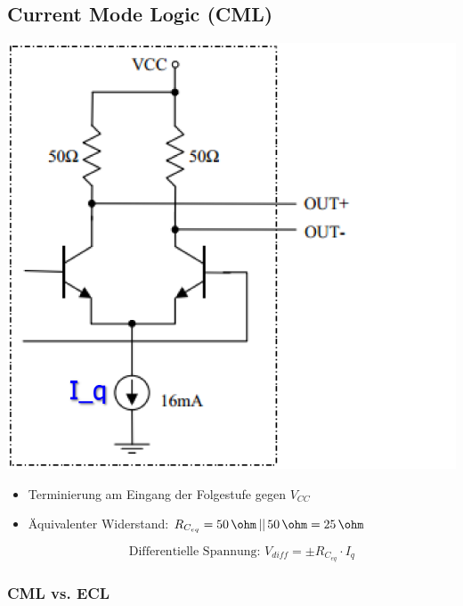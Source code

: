 \subsection{Current Mode Logic (CML)}

\begin{minipage}[c]{0.25\columnwidth}
    \includegraphics[width=\columnwidth]{images/CML.png}
\end{minipage}
\hfill
\begin{minipage}[c]{0.72\columnwidth}
   \begin{itemize}
    \item Terminierung am Eingang der Folgestufe gegen $V_{CC}$
    \item Äquivalenter Widerstand: $R_{C_{eq}} = 50 \, \ohm \, || \, 50 \, \ohm = 25 \, \ohm$
    
    $$ \boxed{ \text{Differentielle Spannung: } V_{diff} = \pm R_{C_{eq}} \cdot I_q }$$
   \end{itemize}
\end{minipage}


\subsubsection{CML vs. ECL}


